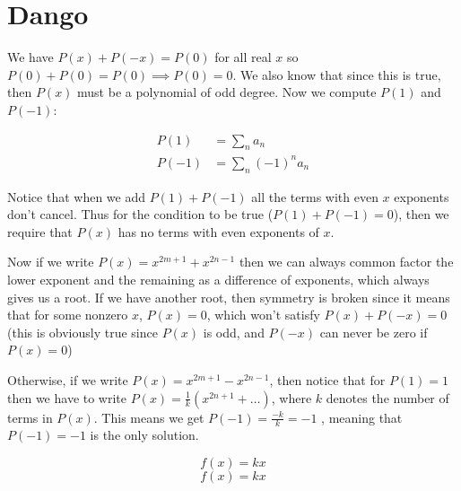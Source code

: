 \documentclass{article}
\theoremstyle{definition}
\numberwithin{equation}{section}
\numberwithin{definition}{section}
\begin{document}
	
	\section{Dango}
	
	We have $P(x) + P(-x) = P(0)$ for all real $x$ so $P(0) + P(0) = P(0) \implies P(0) = 0$. We also know that since this is true, then $P(x)$ must be a polynomial of odd degree. Now we compute $P(1)$ and $P(-1)$:
	
	\begin{align*}
		P(1) &= \sum_n a_n\\
		P(-1) &= \sum_n (-1)^na_n
	\end{align*}

	Notice that when we add $P(1) + P(-1)$ all the terms with even $x$ exponents don't cancel. Thus for the condition to be true ($P(1) + P(-1) = 0$), then we require that $P(x)$ has no terms with even exponents of $x$. 
	
	\medskip
	
	Now if we write $P(x) = x^{2m+1} + x^{2n-1}$ then we can always common factor the lower exponent and the remaining as a difference of exponents, which always gives us a root. If we have another root, then symmetry is broken since it means that for some nonzero $x$, $P(x) = 0$, which won't satisfy $P(x) + P(-x) = 0$ (this is obviously true since $P(x)$ is odd, and $P(-x)$ can never be zero if $P(x) = 0$)
	
	\medskip
	
	Otherwise, if we write $P(x) = x^{2m+1} - x^{2n-1}$, then notice that for $P(1) = 1$ then we have to write $P(x) = \frac 1 k (x^{2n+1} + \dots)$, where $k$ denotes the number of terms in $P(x)$. This means we get $P(-1) = \frac{-k}{k} = -1$ , meaning that $P(-1) = -1$ is the only solution.
	
	
	$$ f(x) = kx$$
	\[f(x) = kx\]
	
\end{document}

